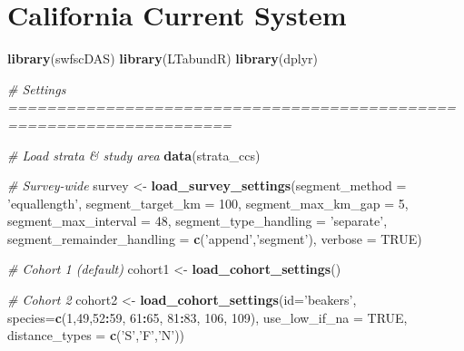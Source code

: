 \documentclass[
]{book}
\newenvironment{Shaded}{\begin{snugshade}}{\end{snugshade}}
\newcommand{\CommentTok}[1]{\textcolor[rgb]{0.56,0.35,0.01}{\textit{#1}}}
\newcommand{\DataTypeTok}[1]{\textcolor[rgb]{0.13,0.29,0.53}{#1}}
\newcommand{\DecValTok}[1]{\textcolor[rgb]{0.00,0.00,0.81}{#1}}
\newcommand{\KeywordTok}[1]{\textcolor[rgb]{0.13,0.29,0.53}{\textbf{#1}}}
\newcommand{\NormalTok}[1]{#1}
\newcommand{\OperatorTok}[1]{\textcolor[rgb]{0.81,0.36,0.00}{\textbf{#1}}}
\newcommand{\OtherTok}[1]{\textcolor[rgb]{0.56,0.35,0.01}{#1}}
\newcommand{\StringTok}[1]{\textcolor[rgb]{0.31,0.60,0.02}{#1}}
\begin{document}
\hypertarget{california-current-system}{%
\chapter{California Current System}\label{california-current-system}}

\begin{Shaded}
\begin{Highlighting}[]
\KeywordTok{library}\NormalTok{(swfscDAS)}
\KeywordTok{library}\NormalTok{(LTabundR)}
\KeywordTok{library}\NormalTok{(dplyr)}

\CommentTok{# Settings =====================================================================}

\CommentTok{# Load strata & study area}
\KeywordTok{data}\NormalTok{(strata_ccs)}

\CommentTok{# Survey-wide}
\NormalTok{survey <-}\StringTok{ }
\StringTok{  }\KeywordTok{load_survey_settings}\NormalTok{(}\DataTypeTok{segment_method =} \StringTok{'equallength'}\NormalTok{,}
                       \DataTypeTok{segment_target_km =} \DecValTok{100}\NormalTok{,}
                       \DataTypeTok{segment_max_km_gap =} \DecValTok{5}\NormalTok{,}
                       \DataTypeTok{segment_max_interval =} \DecValTok{48}\NormalTok{,}
                       \DataTypeTok{segment_type_handling =} \StringTok{'separate'}\NormalTok{,}
                       \DataTypeTok{segment_remainder_handling =} \KeywordTok{c}\NormalTok{(}\StringTok{'append'}\NormalTok{,}\StringTok{'segment'}\NormalTok{),}
                       \DataTypeTok{verbose =} \OtherTok{TRUE}\NormalTok{)}

\CommentTok{# Cohort 1 (default)}
\NormalTok{cohort1 <-}\StringTok{ }\KeywordTok{load_cohort_settings}\NormalTok{()}

\CommentTok{# Cohort 2}
\NormalTok{cohort2 <-}\StringTok{ }
\StringTok{  }\KeywordTok{load_cohort_settings}\NormalTok{(}\DataTypeTok{id=}\StringTok{'beakers'}\NormalTok{,}
                       \DataTypeTok{species=}\KeywordTok{c}\NormalTok{(}\DecValTok{1}\NormalTok{,}\DecValTok{49}\NormalTok{,}\DecValTok{52}\OperatorTok{:}\DecValTok{59}\NormalTok{, }\DecValTok{61}\OperatorTok{:}\DecValTok{65}\NormalTok{, }\DecValTok{81}\OperatorTok{:}\DecValTok{83}\NormalTok{, }\DecValTok{106}\NormalTok{, }\DecValTok{109}\NormalTok{),}
                       \DataTypeTok{use_low_if_na =} \OtherTok{TRUE}\NormalTok{,}
                       \DataTypeTok{distance_types =} \KeywordTok{c}\NormalTok{(}\StringTok{'S'}\NormalTok{,}\StringTok{'F'}\NormalTok{,}\StringTok{'N'}\NormalTok{))}


\end{Highlighting}
\end{Shaded}
\end{document}
